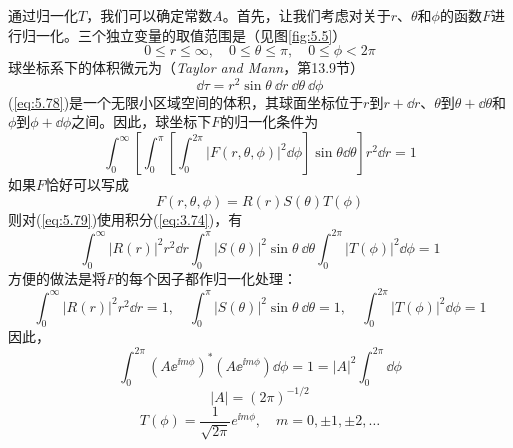     通过归一化$T$，我们可以确定常数$A$。首先，让我们考虑对关于$r$、$\theta$和$\phi$的函数$F$进行归一化。三个独立变量的取值范围是（见图\ref{fig:5.5}）
    \begin{equation}
        \boxed{
            0 \le r \le \infty, \quad 0 \le \theta \le \pi, \quad 0 \le \phi < 2\pi
        }
        \label{eq:5.77}
    \end{equation}
    球坐标系下的体积微元为（\textit{Taylor and Mann}，第13.9节）
    \begin{equation}
        \boxed{
            \dd \tau = r^2\sin\theta \: \dd r \: \dd \theta \: \dd \phi
        }
        \label{eq:5.78}
    \end{equation}
    (\ref{eq:5.78})是一个无限小区域空间的体积，其球面坐标位于$r$到$r+\dd r$、$\theta$到$\theta+\dd \theta$和$\phi$到$\phi+\dd \phi$之间。因此，球坐标下$F$的归一化条件为
    \begin{equation}
        \int_{0}^{\infty}\left[\int_{0}^{\pi}\left[\int_{0}^{2\pi}\left|F\left(r,\theta,\phi\right)\right|^2 \dd \phi\right]\sin\theta \dd \theta\right]r^2\dd r = 1
        \label{eq:5.79}
    \end{equation}
    如果$F$恰好可以写成
    \begin{equation*}
        F\left(r,\theta,\phi\right) = R\left(r\right)S\left(\theta\right)T\left(\phi\right)
    \end{equation*}
    则对(\ref{eq:5.79})使用积分(\ref{eq:3.74})，有
    \begin{equation*}
        \int_{0}^{\infty}\left|R\left(r\right)\right|^2 r^2 \dd r \int_{0}^{\pi}\left|S\left(\theta\right)\right|^2 \sin\theta \: \dd \theta \int_{0}^{2\pi}\left|T\left(\phi\right)\right|^2 \dd \phi = 1
    \end{equation*}
    方便的做法是将$F$的每个因子都作归一化处理：
    \begin{equation}
        \int_{0}^{\infty}\left|R\left(r\right)\right|^2 r^2 \dd r = 1, \quad \int_{0}^{\pi}\left|S\left(\theta\right)\right|^2 \sin\theta \: \dd \theta = 1, \quad \int_{0}^{2\pi}\left|T\left(\phi\right)\right|^2 \dd \phi = 1
        \label{eq:5.80}
    \end{equation}
    因此，
    \begin{equation*}
        \int_{0}^{2\pi}\left(A\ee ^{\ii m\phi}\right)^{\ast}\left(A\ee ^{\ii m\phi}\right) \dd \phi = 1 = \left|A\right|^2\int_{0}^{2\pi} \dd \phi
    \end{equation*}
    \begin{equation*}
        \left|A\right| = \left(2\pi\right)^{-1/2}
    \end{equation*}
    \begin{equation}
        T\left(\phi\right) = \frac{1}{\sqrt{2\pi}}e^{\ii m\phi}, \quad m = 0, \pm 1, \pm 2, \ldots
        \label{eq:5.81}
    \end{equation}

